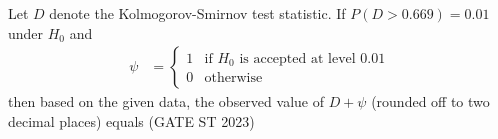 \begin{enumerate}[label=\thechapter.\arabic*,ref=\thechapter.\theenumi]
Let $D$ denote the Kolmogorov-Smirnov test statistic. If $P (D > 0.669) = 0.01$ under $H_0$ and
\begin{align}
    \psi &= 
    \begin{cases}
        1 &  \text{if } H_0 \text{ is accepted at level } 0.01 \\
        0 &  \text{otherwise} 
    \end{cases} 
\end{align}
then based on the given data, the observed value of $D + \psi$ (rounded off to two decimal places) equals
\hfill(GATE ST 2023)
\\

\end{enumerate}
